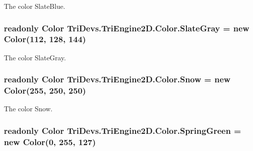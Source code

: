 The color Slate\-Blue. 

\hypertarget{struct_tri_devs_1_1_tri_engine2_d_1_1_color_ad4fa05b55f8964cd46275ad16aa431d0}{
\subsubsection[{Slate\-Gray}]{\setlength{\rightskip}{0pt plus 5cm}readonly {\bf Color} Tri\-Devs.\-Tri\-Engine2\-D.\-Color.\-Slate\-Gray = new {\bf Color}(112, 128, 144)\hspace{0.3cm}{\ttfamily [static]}}}\label{struct_tri_devs_1_1_tri_engine2_d_1_1_color_ad4fa05b55f8964cd46275ad16aa431d0}


The color Slate\-Gray. 

\hypertarget{struct_tri_devs_1_1_tri_engine2_d_1_1_color_aacf9b7d1f37da2a12e227af39c8ab117}{
\subsubsection[{Snow}]{\setlength{\rightskip}{0pt plus 5cm}readonly {\bf Color} Tri\-Devs.\-Tri\-Engine2\-D.\-Color.\-Snow = new {\bf Color}(255, 250, 250)\hspace{0.3cm}{\ttfamily [static]}}}\label{struct_tri_devs_1_1_tri_engine2_d_1_1_color_aacf9b7d1f37da2a12e227af39c8ab117}


The color Snow. 

\hypertarget{struct_tri_devs_1_1_tri_engine2_d_1_1_color_a9350253dc25b130a1b5b38f59bd1d9f8}{
\subsubsection[{Spring\-Green}]{\setlength{\rightskip}{0pt plus 5cm}readonly {\bf Color} Tri\-Devs.\-Tri\-Engine2\-D.\-Color.\-Spring\-Green = new {\bf Color}(0, 255, 127)\hspace{0.3cm}{\ttfamily [static]}}}\label{struct_tri_devs_1_1_tri_engine2_d_1_1_color_a9350253dc25b130a1b5b38f59bd1d9f8}


